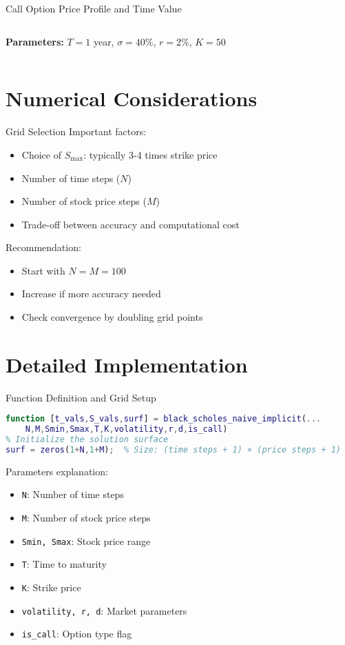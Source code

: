 \documentclass{beamer}
\begin{document}
\begin{frame}{Call Option Price Profile and Time Value}
\begin{columns}
\begin{column}{0.5\textwidth}
            \textbf{Parameters:} $T = 1$ year, $\sigma = 40\%$, $r = 2\%$, $K = 50$
        \end{column}
    \end{columns}
\end{frame}

\section{Numerical Considerations}

\begin{frame}{Grid Selection}
    Important factors:
    \begin{itemize}
        \item Choice of $S_{\text{max}}$: typically 3-4 times strike price
        \item Number of time steps ($N$)
        \item Number of stock price steps ($M$)
        \item Trade-off between accuracy and computational cost
    \end{itemize}
    
    Recommendation:
    \begin{itemize}
        \item Start with $N = M = 100$
        \item Increase if more accuracy needed
        \item Check convergence by doubling grid points
    \end{itemize}
\end{frame}

\section{Detailed Implementation}


\begin{frame}[fragile]{Function Definition and Grid Setup}
    \begin{lstlisting}[language=Matlab]
function [t_vals,S_vals,surf] = black_scholes_naive_implicit(...
    N,M,Smin,Smax,T,K,volatility,r,d,is_call)
% Initialize the solution surface
surf = zeros(1+N,1+M);  % Size: (time steps + 1) × (price steps + 1)
    \end{lstlisting}
    
    Parameters explanation:
    \begin{itemize}
        \item \texttt{N}: Number of time steps
        \item \texttt{M}: Number of stock price steps
        \item \texttt{Smin, Smax}: Stock price range
        \item \texttt{T}: Time to maturity
        \item \texttt{K}: Strike price
        \item \texttt{volatility, r, d}: Market parameters
        \item \texttt{is\_call}: Option type flag
    \end{itemize}
\end{frame}
\end{document}
